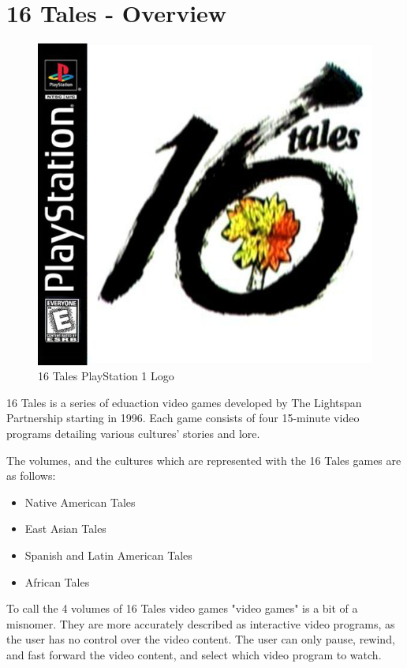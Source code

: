 \chapter{16 Tales - Overview}

\begin{figure}[H]
    \centering
    \includegraphics[width=\textwidth / 2]{"./Games/16Tales/Images/16TalesGeneralLogo.png"}
    \caption{16 Tales PlayStation 1 Logo}
\end{figure}

16 Tales is a series of eduaction video games developed by The Lightspan Partnership starting in 1996.
Each game consists of four 15-minute video programs detailing various cultures' stories and lore.

The volumes, and the cultures which are represented with the 16 Tales games are as follows:

\begin{itemize}
    \item Native American Tales
    \item East Asian Tales
    \item Spanish and Latin American Tales
    \item African Tales
\end{itemize}

To call the 4 volumes of 16 Tales video games "video games" is a bit of a misnomer.
They are more accurately described as interactive video programs, as the user has no control over the video content.
The user can only pause, rewind, and fast forward the video content, and select which video program to watch.

